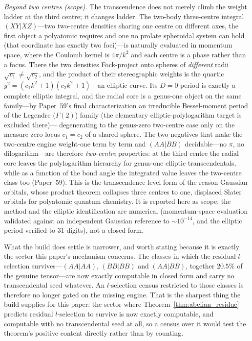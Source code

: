 \documentclass[aps,pra,twocolumn,superscriptaddress,longbibliography]{revtex4-2}
\begin{document}
\emph{Beyond two centres (scope).}  The transcendence does not merely climb the
weight ladder at the third centre; it changes ladder.  The two-body
three-centre integral $(XY|XZ)$---two two-centre densities sharing one centre
on different axes, the first object a polyatomic requires and one no prolate
spheroidal system can hold (that coordinate has exactly two foci)---is
naturally evaluated in momentum space, where the Coulomb kernel is $4\pi/k^2$
and each centre is a phase rather than a focus.  There the two densities
Fock-project onto spheres of \emph{different} radii $\sqrt{c_1}\neq\sqrt{c_2}$,
and the product of their stereographic weights is the quartic
$y^2=(c_1 k^2+1)(c_2 k^2+1)$---an elliptic curve.  Its $D=0$ period is exactly a
complete elliptic integral, and the radial core is a genus-one object on the
same family---by Paper~59's final characterization an irreducible Bessel-moment
period of the Legendre ($\Gamma(2)$) family (the elementary elliptic-polylogarithm
target is excluded there)---%
degenerating to the genus-zero two-centre case only
on the measure-zero locus $c_1=c_2$ of a shared sphere.  The two negatives that
make the two-centre engine weight-one term by term and $(AA|BB)$ decidable---no $\pi$, no
dilogarithm---are therefore \emph{two-centre} properties: at the third centre the radial
core leaves the polylogarithm hierarchy for genus-one elliptic transcendentals, while
as a function of the bond angle the integrated value leaves the two-centre class too (Paper~59).
This is the transcendence-level form of the reason Gaussian orbitals, whose
product theorem collapses three centres to one, displaced Slater orbitals for
polyatomic quantum chemistry.  It is reported here as scope; the method and the
elliptic identification are numerical (momentum-space evaluation validated
against an independent Gaussian reference to $\sim\!10^{-14}$, and the elliptic
period verified to $31$ digits), not a closed form.

What the build does settle is narrower, and worth stating because it is
exactly the sector this paper's mechanism concerns.  The classes in which
the residual $l$-selection survives---$(AA|AA)$, $(BB|BB)$ and
$(AA|BB)$, together $20.5\%$ of the genuine tensor---are now exactly
computable in closed form and carry no transcendental seed whatever.  An
$l$-selection census restricted to those classes is therefore no longer
gated on the missing engine.  That is the sharpest thing the build
supplies for this paper: the sector where
Theorem~\ref{thm:abelian_residue} predicts residual $l$-selection to
survive is now exactly computable, and computable with no transcendental
seed at all, so a census over it would test the theorem's positive content
directly rather than by counting.
\end{document}
